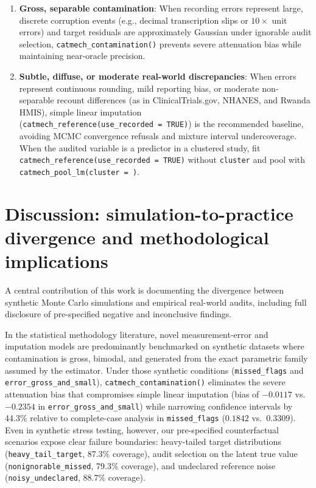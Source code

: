 \documentclass[
]{article}
\providecommand{\tightlist}{%
  \setlength{\itemsep}{0pt}\setlength{\parskip}{0pt}}
\begin{document}
\begin{enumerate}
\def\labelenumi{\arabic{enumi}.}
\tightlist
\item
  \textbf{Gross, separable contamination}: When recording errors
  represent large, discrete corruption events (e.g., decimal
  transcription slips or \(10\times\) unit errors) and target residuals
  are approximately Gaussian under ignorable audit selection,
  \texttt{catmech\_contamination()} prevents severe attenuation bias
  while maintaining near-oracle precision.
\item
  \textbf{Subtle, diffuse, or moderate real-world discrepancies}: When
  errors represent continuous rounding, mild reporting bias, or moderate
  non-separable recount differences (as in ClinicalTrials.gov, NHANES,
  and Rwanda HMIS), simple linear imputation
  (\texttt{catmech\_reference(use\_recorded\ =\ TRUE)}) is the
  recommended baseline, avoiding MCMC convergence refusals and mixture
  interval undercoverage. When the audited variable is a predictor in a
  clustered study, fit
  \texttt{catmech\_reference(use\_recorded\ =\ TRUE)} without
  \texttt{cluster} and pool with
  \texttt{catmech\_pool\_lm(cluster\ =\ )}.
\end{enumerate}

\section{Discussion: simulation-to-practice divergence and
methodological
implications}\label{discussion-simulation-to-practice-divergence-and-methodological-implications}

A central contribution of this work is documenting the divergence
between synthetic Monte Carlo simulations and empirical real-world
audits, including full disclosure of pre-specified negative and
inconclusive findings.

In the statistical methodology literature, novel measurement-error and
imputation models are predominantly benchmarked on synthetic datasets
where contamination is gross, bimodal, and generated from the exact
parametric family assumed by the estimator. Under those synthetic
conditions (\texttt{missed\_flags} and
\texttt{error\_gross\_and\_small}), \texttt{catmech\_contamination()}
eliminates the severe attenuation bias that compromises simple linear
imputation (bias of \(-0.0117\) vs.~\(-0.2354\) in
\texttt{error\_gross\_and\_small}) while narrowing confidence intervals
by 44.3\% relative to complete-case analysis in \texttt{missed\_flags}
(\(0.1842\) vs.~\(0.3309\)). Even in synthetic stress testing, however,
our pre-specified counterfactual scenarios expose clear failure
boundaries: heavy-tailed target distributions
(\texttt{heavy\_tail\_target}, 87.3\% coverage), audit selection on the
latent true value (\texttt{nonignorable\_missed}, 79.3\% coverage), and
undeclared reference noise (\texttt{noisy\_undeclared}, 88.7\%
coverage).
\end{document}
